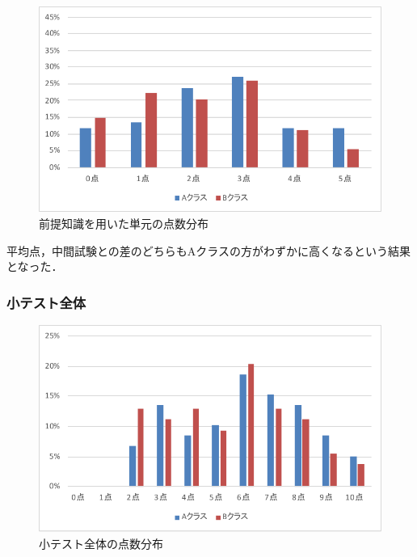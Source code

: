 \documentclass[a4j,12pt]{jsarticle}
\begin{document}
\begin{figure}[H]
\centering
\includegraphics[width=12cm]{3test.pdf}
\caption{前提知識を用いた単元の点数分布}
\label{fig:no}
\end{figure} 


\begin{table}[H]
\centering
{}
\caption{前提知識を用いた単元の平均点の比較}
\label{fig:12ank}
\end{table}

平均点，中間試験との差のどちらもAクラスの方がわずかに高くなるという結果となった．




\newpage
\subsubsection{小テスト全体}

\begin{figure}[H]
\centering
\includegraphics[width=12cm]{123test.pdf}
\caption{小テスト全体の点数分布}
\label{fig:no}
\end{figure}
\end{document}
